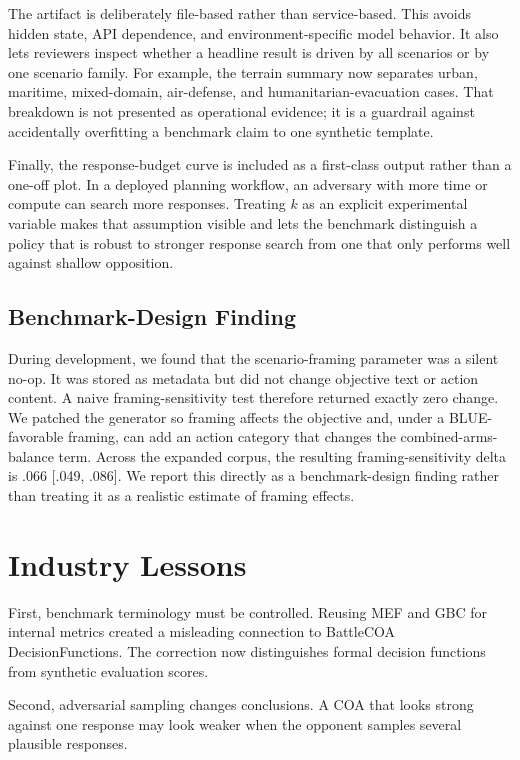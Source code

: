 \documentclass[sigconf]{acmart}
\begin{document}
The artifact is deliberately file-based rather than service-based. This avoids hidden state, API dependence, and environment-specific model behavior. It also lets reviewers inspect whether a headline result is driven by all scenarios or by one scenario family. For example, the terrain summary now separates urban, maritime, mixed-domain, air-defense, and humanitarian-evacuation cases. That breakdown is not presented as operational evidence; it is a guardrail against accidentally overfitting a benchmark claim to one synthetic template.

Finally, the response-budget curve is included as a first-class output rather than a one-off plot. In a deployed planning workflow, an adversary with more time or compute can search more responses. Treating $k$ as an explicit experimental variable makes that assumption visible and lets the benchmark distinguish a policy that is robust to stronger response search from one that only performs well against shallow opposition.

\subsection{Benchmark-Design Finding}

During development, we found that the scenario-framing parameter was a silent no-op. It was stored as metadata but did not change objective text or action content. A naive framing-sensitivity test therefore returned exactly zero change. We patched the generator so framing affects the objective and, under a BLUE-favorable framing, can add an action category that changes the combined-arms-balance term. Across the expanded corpus, the resulting framing-sensitivity delta is .066 [.049, .086]. We report this directly as a benchmark-design finding rather than treating it as a realistic estimate of framing effects.

\section{Industry Lessons}

First, benchmark terminology must be controlled. Reusing MEF and GBC for internal metrics created a misleading connection to BattleCOA DecisionFunctions. The correction now distinguishes formal decision functions from synthetic evaluation scores.

Second, adversarial sampling changes conclusions. A COA that looks strong against one response may look weaker when the opponent samples several plausible responses.
\end{document}
